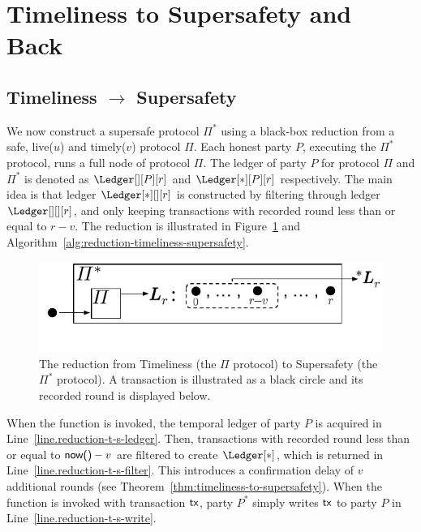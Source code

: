 \section{Timeliness to Supersafety and Back}\label{sec:forward-reduction}

\subsection{Timeliness $\rightarrow$ Supersafety}

We now construct a supersafe protocol
$\Pi^*$ using a black-box reduction from a safe, live($u$) and timely($v$)
protocol $\Pi$.
Each honest party $P$, executing the $\Pi^*$ protocol, runs a
full node of protocol $\Pi$.
The ledger of party $P$ for protocol $\Pi$ and $\Pi^*$ is denoted as $\Ledger[][P][r]$ and
$\Ledger[*][P][r]$ respectively.
The main idea is that ledger $\Ledger[*][][r]$ is constructed
by filtering through ledger $\Ledger[][][r]$, and only keeping transactions
with recorded round less than or equal to $r - v$.
The reduction is illustrated
in Figure~\ref{fig:reduction-timeliness-supersafety} and Algorithm~\ref{alg:reduction-timeliness-supersafety}.

\begin{figure}
  \centering
  \includegraphics[width=0.7\columnwidth,keepaspectratio]{figures/forward-reduction.pdf}
  \caption{The reduction from Timeliness
    (the $\Pi$ protocol) to Supersafety (the $\Pi^*$ protocol). A transaction is illustrated
    as a black circle and its recorded round is displayed below.
  }
 \label{fig:reduction-timeliness-supersafety}
\end{figure}

When the \rread function is invoked, the temporal ledger of party $P$ is acquired
in Line~\ref{line.reduction-t-s-ledger}.
Then, transactions with recorded round less than or equal to $\textsf{now()} - v$ are
filtered to create $\Ledger[*]$, which is returned in Line~\ref{line.reduction-t-s-filter}.
This introduces a confirmation delay of $v$ additional rounds (see Theorem~\ref{thm:timeliness-to-supersafety}).
When the \wwrite function is invoked with transaction $\textsf{tx}$, party $P^*$ simply writes $\textsf{tx}$
to party $P$ in Line~\ref{line.reduction-t-s-write}.

